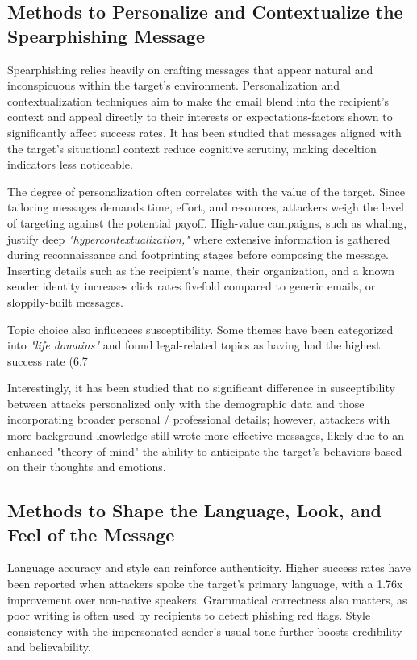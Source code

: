 \subsection{Methods to Personalize and Contextualize the Spearphishing Message}
Spearphishing relies heavily on crafting messages that appear natural and inconspicuous within the target's environment. Personalization and contextualization techniques aim to make the email blend into the recipient's context and appeal directly to their interests or expectations-factors shown to significantly affect success rates. It has been studied that messages aligned with the target's situational context reduce cognitive scrutiny, making deceltion indicators less noticeable.

The degree of personalization often correlates with the value of the target. Since tailoring messages demands time, effort, and resources, attackers weigh the level of targeting against the potential payoff. High-value campaigns, such as whaling, justify deep \textit{"hypercontextualization,"} where extensive information is gathered during reconnaissance and footprinting stages before composing the message. Inserting details such as the recipient's name, their organization, and a known sender identity increases click rates fivefold compared to generic emails, or sloppily-built messages.

Topic choice also influences susceptibility. Some themes have been categorized into \textit{"life domains"} and found legal-related topics as having had the highest success rate (6.7%

Interestingly, it has been studied that no significant difference in susceptibility between attacks personalized only with the demographic data and those incorporating broader personal / professional details; however, attackers with more background knowledge still wrote more effective messages, likely due to an enhanced "theory of mind"-the ability to anticipate the target's behaviors based on their thoughts and emotions.

\subsection{Methods to Shape the Language, Look, and Feel of the Message}
Language accuracy and style can reinforce authenticity. Higher success rates have been reported when attackers spoke the target's primary language, with a 1.76x improvement over non-native speakers. Grammatical correctness also matters, as poor writing is often used by recipients to detect phishing red flags. Style consistency with the impersonated sender's usual tone further boosts credibility and believability.

